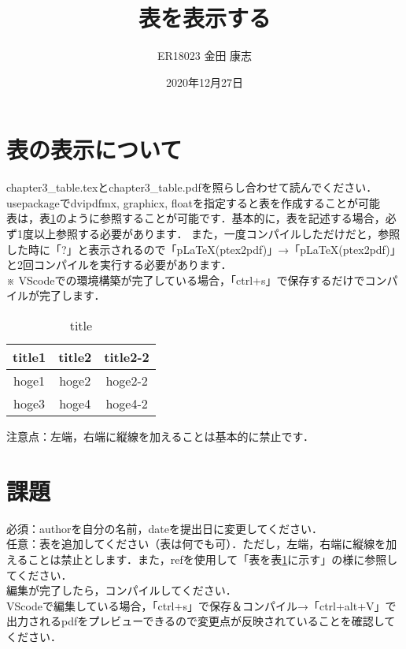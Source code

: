 \documentclass[a4paper,10pt]{jsarticle}
\title{表を表示する}%
\author{ER18023 金田 康志}%
\date{2020年12月27日}%
\begin{document}
\maketitle%
\section{表の表示について}
chapter3\_table.texとchapter3\_table.pdfを照らし合わせて読んでください．\\

usepackageでdvipdfmx, graphicx, floatを指定すると表を作成することが可能\\

表は，表\ref{tb:label}のように参照することが可能です．基本的に，表を記述する場合，必ず1度以上参照する必要があります．
また，一度コンパイルしただけだと，参照した時に「?」と表示されるので「pLaTeX(ptex2pdf)」→「pLaTeX(ptex2pdf)」と2回コンパイルを実行する必要があります．\\
※ VScodeでの環境構築が完了している場合，「ctrl+s」で保存するだけでコンパイルが完了します．
\begin{table}[H]
    \caption{title}
    \label{tb:label}                 
    \centering                     
    \begin{tabular}{c | c  c}
        \hline                        
        title1 & title2 & title2-2 \\          
        \hline \hline
        hoge1 & hoge2 & hoge2-2 \\
        hoge3 & hoge4 & hoge4-2 \\
        \hline
    \end{tabular}
\end{table}
注意点：左端，右端に縦線を加えることは基本的に禁止です．

\section{課題}
\noindent 必須：authorを自分の名前，dateを提出日に変更してください．\\
任意：表を追加してください（表は何でも可）．ただし，左端，右端に縦線を加えることは禁止とします．また，refを使用して「表を表\ref{tb:label}に示す」の様に参照してください．\\

\noindent 編集が完了したら，コンパイルしてください．\\
VScodeで編集している場合，「ctrl+s」で保存＆コンパイル→「ctrl+alt+V」で出力されるpdfをプレビューできるので変更点が反映されていることを確認してください．\\
\end{document}
